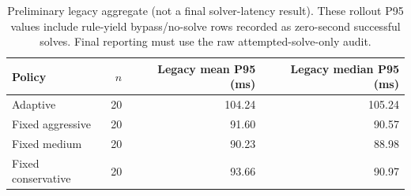 \begin{table}[t]
\centering\small
\caption{Preliminary legacy aggregate (not a final solver-latency result). These rollout P95 values include rule-yield bypass/no-solve rows recorded as zero-second successful solves. Final reporting must use the raw attempted-solve-only audit.}
\label{tab:supervisor-feedback-policy-cost}
\begin{tabular}{@{}lrrr@{}}
\toprule
Policy & $n$ & Legacy mean P95 (ms) & Legacy median P95 (ms) \\
\midrule
Adaptive & 20 & 104.24 & 105.24 \\
Fixed aggressive & 20 & 91.60 & 90.57 \\
Fixed medium & 20 & 90.23 & 88.98 \\
Fixed conservative & 20 & 93.66 & 90.97 \\
\bottomrule
\end{tabular}
\end{table}
